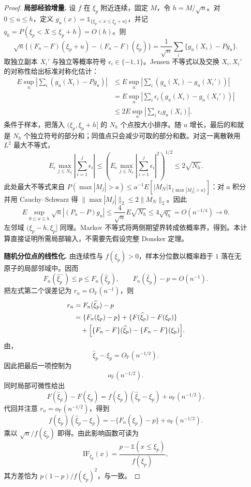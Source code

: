 \begin{proof}
\textbf{局部经验增量.}
设 $f$ 在 $\xi_p$ 附近连续，固定 $M$，令 $h=M/\sqrt n$。对 $0\le u\le h$，定义 $g_u(x)=\mathds{1}_{\{\xi_p<x\le\xi_p+u\}}$，并记 $q_h=P(\xi_p<X\le\xi_p+h)=O(h)$。则
\[
 \sqrt n\{(F_n-F)(\xi_p+u)-(F_n-F)(\xi_p)\}
 =\frac1{\sqrt n}\sum_i\{g_u(X_i)-Pg_u\}.
\]
取独立副本 $X_i'$ 与独立等概率符号 $\epsilon_i\in\{-1,1\}$。Jensen 不等式以及交换 $X_i,X_i'$ 的对称性给出标准对称化估计：
\begin{align*}
 E\sup_u\left|\sum_i(g_u(X_i)-Pg_u)\right|
 &\le E\sup_u\left|\sum_i(g_u(X_i)-g_u(X_i'))\right|\\
 &=E\sup_u\left|\sum_i\epsilon_i(g_u(X_i)-g_u(X_i'))\right|\\
 &\le2E\sup_u\left|\sum_i\epsilon_i g_u(X_i)\right|.
\end{align*}
条件于样本，把落入 $(\xi_p,\xi_p+h]$ 的 $N_h$ 个点按大小排序。随 $u$ 增长，最后的和就是 $N_h$ 个独立符号的部分和；同值点只会减少可取的部分和数。对这一离散鞅用 $L^2$ 最大不等式，
\[
 E_\epsilon\max_{j\le N_h}\left|\sum_{i=1}^j\epsilon_i\right|
 \le\left(E_\epsilon\max_{j\le N_h}\left|\sum_{i=1}^j\epsilon_i\right|^2\right)^{1/2}
 \le2\sqrt{N_h}.
\]
此处最大不等式来自 $P(\max|M_j|>a)\le a^{-1}E[|M_N|\mathds{1}_{\{\max|M_j|>a\}}]$：对 $a$ 积分并用 Cauchy--Schwarz 得 $\|\max|M_j|\|_2\le2\|M_N\|_2$。因此
\[
 E\sup_{0\le u\le h}\sqrt n|(P_n-P)g_u|
 \le\frac4{\sqrt n}E\sqrt{N_h}
 \le4\sqrt{q_h}=O(n^{-1/4})\longrightarrow0.
\]
左邻域 $(\xi_p-h,\xi_p]$ 同理。Markov 不等式将两侧期望界转成依概率界，得到。本计算直接证明所需局部输入，不需要先假设完整 Donsker 定理。

\textbf{随机分位点的线性化.}
由连续性与 $f(\xi_p)>0$，样本分位数以概率趋于 $1$ 落在无原子的局部邻域中。因而
\[
 F_n(\widehat\xi_p^- )\le p\le F_n(\widehat\xi_p),
 \qquad
 F_n(\widehat\xi_p)-p=O(n^{-1}).
\]
把左式第二个误差记为 $r_n=O_{\mathbb P}(n^{-1})$，则
\begin{align*}
 r_n
 &=F_n(\widehat\xi_p)-p\\
 &=\{F_n(\xi_p)-p\}
 +\{F(\widehat\xi_p)-F(\xi_p)\}\\
 &\quad+
 \Bigl[
 \{F_n-F\}(\widehat\xi_p)
 -\{F_n-F\}(\xi_p)
 \Bigr].
\end{align*}
由，
\[
 \widehat\xi_p-\xi_p=O_{\mathbb P}(n^{-1/2}).
\]
因此把最后一项控制为
\[
 o_{\mathbb P}(n^{-1/2}).
\]
同时局部可微性给出
\[
 F(\widehat\xi_p)-F(\xi_p)
 =f(\xi_p)(\widehat\xi_p-\xi_p)
 +o_{\mathbb P}(n^{-1/2}).
\]
代回并注意 $r_n=o_{\mathbb P}(n^{-1/2})$，得到
\[
 f(\xi_p)(\widehat\xi_p-\xi_p)
 =-\{F_n(\xi_p)-p\}
 +o_{\mathbb P}(n^{-1/2}).
\]
乘以 $\sqrt n/f(\xi_p)$ 即得。由此影响函数可读为
\[
 \mathrm{IF}_{\xi_p}(x)
 =\frac{p-\mathds{1}(x\le\xi_p)}{f(\xi_p)},
\]
其方差恰为 $p(1-p)/f(\xi_p)^2$，与一致。
\end{proof}

